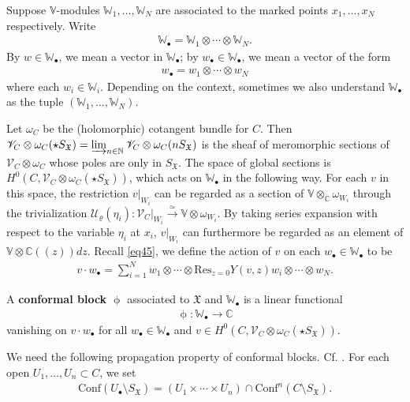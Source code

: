 \documentclass[12pt,a4paper,notitlepage]{article}
\theoremstyle{definition}
\theoremstyle{plain}
\newcommand{\fk}{\mathfrak}
\newcommand{\mc}{\mathcal}
\newcommand{\Conf}{\mathrm{Conf}}
\newcommand{\Res}{\mathrm{Res}}
\newcommand{\scr}{\mathscr}
\newcommand{\SX}{{S_{\fk X}}}
\newcommand{\blt}{\bullet}
\newcommand{\Vbb}{\mathbb V}
\newcommand{\Wbb}{\mathbb W}
\newcommand{\Cbb}{\mathbb C}
\newcommand{\Nbb}{\mathbb N}
\numberwithin{equation}{subsection}
\begin{document}
Suppose $\Vbb$-modules $\Wbb_1,\dots,\Wbb_N$ are associated to the marked points $x_1,\dots,x_N$ respectively. Write
\begin{align*}
\Wbb_\blt=\Wbb_1\otimes\cdots\otimes \Wbb_N.	
\end{align*}
By $w\in\Wbb_\blt$, we mean a vector in $\Wbb_\blt$; by $w_\blt\in\Wbb_\blt$, we mean a vector of the form
\begin{align*}
w_\blt=w_1\otimes\cdots\otimes w_N	
\end{align*}
where each $w_i\in \Wbb_i$. Depending on the context, sometimes we also understand $\Wbb_\blt$ as the tuple $(\Wbb_1,\dots,\Wbb_N)$. 


Let $\omega_C$ be the (holomorphic) cotangent bundle for $C$. Then $\scr V_C\otimes\omega_C(\star\SX)=\varinjlim_{n\in\Nbb}\scr V_C\otimes\omega_C(n\SX)$ is the sheaf of meromorphic sections of $\scr V_C\otimes\omega_C$ whose poles are only in $\SX$. The space of global sections is $H^0(C,\scr V_C\otimes\omega_C(\star\SX))$, which acts on $\Wbb_\blt$ in the following way. For each $v$ in this space, the restriction $v|_{W_i}$ can be regarded as a section of $\Vbb\otimes_\Cbb\omega_{W_i}$ through the trivialization $\mc U_\varrho(\eta_i):\scr V_C|_{W_i}\xrightarrow{\simeq}\Vbb\otimes\omega_{W_i}$. By taking series expansion with respect to the variable $\eta_i$ at $x_i$, $v|_{W_i}$ can furthermore be regarded as an element of $\Vbb\otimes\Cbb((z))dz$. Recall \eqref{eq45}, we define the action of $v$ on each $w_\blt\in\Wbb_\blt$ to be
\begin{align*}
v\cdot w_\blt=\sum_{i=1}^N w_1\otimes\cdots\otimes \Res_{z=0}Y(v,z)w_i \otimes\cdots\otimes w_N.	
\end{align*} 



A \textbf{conformal block} $\upphi$ associated to $\fk X$ and $\Wbb_\blt$ is a linear functional
\begin{align*}
\upphi:\Wbb_\blt\rightarrow\Cbb	
\end{align*}
vanishing on $v\cdot w_\blt$ for all $w_\blt\in\Wbb_\blt$ and $v\in H^0(C,\scr V_C\otimes\omega_C(\star\SX))$.


We need the following propagation property of conformal blocks. Cf. \cite[Sec. 8]{Gui21b}. For each open $U_1,\dots,U_n\subset C$, we set \index{Conf@$\Conf(U_\blt\setminus\SX)$}
\begin{gather*}
\Conf(U_\blt\setminus\SX)=(U_1\times\cdots\times U_n)\cap\Conf^n(C\setminus\SX).	
\end{gather*}
\end{document}
